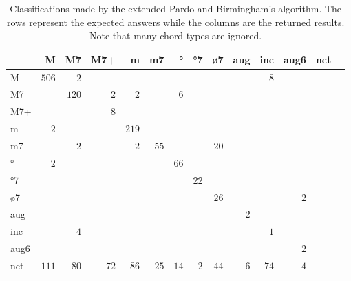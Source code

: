\documentclass{article}
\begin{document}
\begin{table*}
\centering
\begin{tabular}{l||r|r|r|r|r|r|r|r|r|r|r|r|r|}
      &     M &    M7 &   M7+ &     m &    m7 &    ° &   °7 &   ø7 &   aug &   inc &  aug6 &   nct \\  \hline \hline
    M & $ 506 $ & $   2 $ & $     $ & $     $ & $     $ & $     $ & $     $ & $     $ & $     $ & $   8 $ & $     $ & $     $ \\ \hline
   M7 & $     $ & $ 120 $ & $   2 $ & $   2 $ & $     $ & $   6 $ & $     $ & $     $ & $     $ & $     $ & $     $ & $     $ \\ \hline
  M7+ & $     $ & $     $ & $   8 $ & $     $ & $     $ & $     $ & $     $ & $     $ & $     $ & $     $ & $     $ & $     $ \\ \hline
    m & $   2 $ & $     $ & $     $ & $ 219 $ & $     $ & $     $ & $     $ & $     $ & $     $ & $     $ & $     $ & $     $ \\ \hline
   m7 & $     $ & $   2 $ & $     $ & $   2 $ & $  55 $ & $     $ & $     $ & $  20 $ & $     $ & $     $ & $     $ & $     $ \\ \hline
   ° & $   2 $ & $     $ & $     $ & $     $ & $     $ & $  66 $ & $     $ & $     $ & $     $ & $     $ & $     $ & $     $ \\ \hline
  °7 & $     $ & $     $ & $     $ & $     $ & $     $ & $     $ & $  22 $ & $     $ & $     $ & $     $ & $     $ & $     $ \\ \hline
  ø7 & $     $ & $     $ & $     $ & $     $ & $     $ & $     $ & $     $ & $  26 $ & $     $ & $     $ & $   2 $ & $     $ \\ \hline
  aug & $     $ & $     $ & $     $ & $     $ & $     $ & $     $ & $     $ & $     $ & $   2 $ & $     $ & $     $ & $     $ \\ \hline
  inc & $     $ & $   4 $ & $     $ & $     $ & $     $ & $     $ & $     $ & $     $ & $     $ & $   1 $ & $     $ & $     $ \\ \hline
 aug6 & $     $ & $     $ & $     $ & $     $ & $     $ & $     $ & $     $ & $     $ & $     $ & $     $ & $   2 $ & $     $ \\ \hline
  nct & $ 111 $ & $  80 $ & $  72 $ & $  86 $ & $  25 $ & $  14 $ & $   2 $ & $  44 $ & $   6 $ & $  74 $ & $   4 $ & $     $ \\ \hline
\end{tabular}

\caption{Classifications made by the extended Pardo and Birmingham's algorithm. The rows represent
  the expected answers while the columns are the returned
  results. Note that many chord types are ignored.}
\label{tab:erros-es-pb}
\end{table*}
\end{document}
